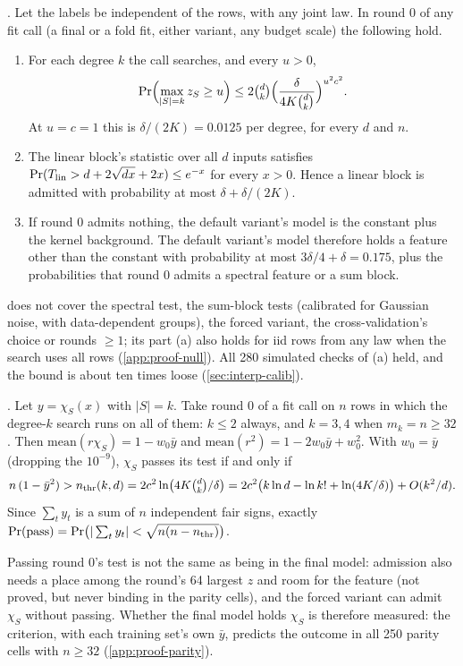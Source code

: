 \begin{proposition}\label{prop:null}
. Let the labels be independent of the rows, with any joint law. In round 0 of any fit call (a final or a fold fit, either variant, any budget scale) the following hold.
\begin{enumerate}[label=(\alph*)]
\item For each degree $k$ the call searches, and every $u>0$,
\[
\Pr\Bigl(\max_{|S|=k}z_S\ge u\Bigr)\le2\tbinom dk\Bigl(\frac\delta{4K\binom dk}\Bigr)^{u^2c^2}.
\]
At $u=c=1$ this is $\delta/(2K)=0.0125$ per degree, for every $d$ and $n$.
\item The linear block's statistic over all $d$ inputs satisfies $\Pr(T_{\rm lin}>d+2\sqrt{dx}+2x)\le e^{-x}$ for every $x>0$. Hence a linear block is admitted with probability at most $\delta+\delta/(2K)$.
\item If round 0 admits nothing, the default variant's model is the constant plus the kernel background. The default variant's model therefore holds a feature other than the constant with probability at most $3\delta/4+\delta=0.175$, plus the probabilities that round 0 admits a spectral feature or a sum block.
\end{enumerate}
\end{proposition}
 does not cover the spectral test, the sum-block tests (calibrated for Gaussian noise, with data-dependent groups), the forced variant, the cross-validation's choice or rounds $\ge1$; its part (a) also holds for iid rows from any law when the search uses all rows (\cref{app:proof-null}). All 280 simulated checks of (a) held, and the bound is about ten times loose (\cref{sec:interp-calib}).

\begin{proposition}\label{prop:parity}
. Let $y=\chi_S(x)$ with $|S|=k$. Take round 0 of a fit call on $n$ rows in which the degree-$k$ search runs on all of them: $k\le2$ always, and $k=3,4$ when $m_k=n\ge32$. Then $\mathrm{mean}(r\chi_S)=1-w_0\bar y$ and $\mathrm{mean}(r^2)=1-2w_0\bar y+w_0^2$. With $w_0=\bar y$ (dropping the $10^{-9}$), $\chi_S$ passes its test if and only if
\begin{equation}\label{eq:nthr}
n\,(1-\bar y^2)>n_{\rm thr}(k,d)=2c^2\ln\bigl(4K\tbinom dk/\delta\bigr)=2c^2\bigl(k\ln d-\ln k!+\ln(4K/\delta)\bigr)+O(k^2/d).
\end{equation}
Since $\sum_ty_t$ is a sum of $n$ independent fair signs, exactly $\Pr(\text{pass})=\Pr\bigl(|\sum_ty_t|<\sqrt{n(n-n_{\rm thr})}\bigr)$.
\end{proposition}
Passing round 0's test is not the same as being in the final model: admission also needs a place among the round's 64 largest $z$ and room for the feature (not proved, but never binding in the parity cells), and the forced variant can admit $\chi_S$ without passing. Whether the final model holds $\chi_S$ is therefore measured: the criterion, with each training set's own $\bar y$, predicts the outcome in all 250 parity cells with $n\ge32$ (\cref{app:proof-parity}).

